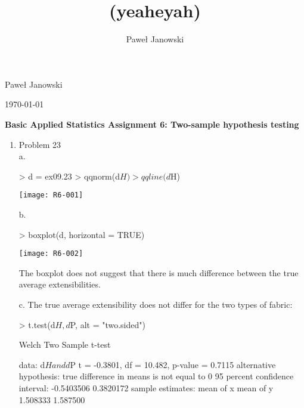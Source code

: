\documentclass[11pt,letterpaper]{article}
\title{(yeaheyah)}
\author{Pawe\l{} Janowski}
\begin{document}
\begin{flushright}
\parskip 0pt
Pawe\l{} Janowski
 
\today
\vspace{10 mm}
\end{flushright}
\begin{center}
\begin{Large}
\textbf{Basic Applied Statistics
Assignment 6: Two-sample hypothesis testing}
\vspace{10 mm}
\end{Large}
\end{center}


\begin{enumerate}
\item Problem 23 \\
a.

\begin{Schunk}
\begin{Sinput}
> d = ex09.23
> qqnorm(d$H)
> qqline(d$H)
\end{Sinput}
\end{Schunk}
\texttt{[image: R6-001]}

b.
\begin{Schunk}
\begin{Sinput}
> boxplot(d, horizontal = TRUE)
\end{Sinput}
\end{Schunk}
\texttt{[image: R6-002]}

The boxplot does not suggest that there is much difference between the true average extensibilities.

c. The true average extensibility does not differ for the two types of fabric:

\begin{Schunk}
\begin{Sinput}
> t.test(d$H, d$P, alt = "two.sided")
\end{Sinput}
\begin{Soutput}
	Welch Two Sample t-test

data:  d$H and d$P 
t = -0.3801, df = 10.482, p-value = 0.7115
alternative hypothesis: true difference in means is not equal to 0 
95 percent confidence interval:
 -0.5403506  0.3820172 
sample estimates:
mean of x mean of y 
 1.508333  1.587500 
\end{Soutput}
\end{Schunk}


\end{enumerate}
\end{document}
